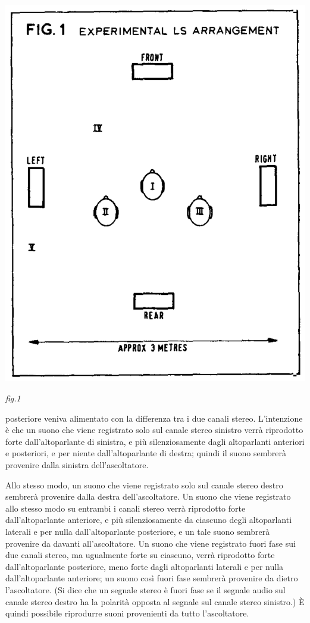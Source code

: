 \documentclass[11pt]{article}
\begin{document}
\begin{multicols*}{2}
\begin{center}
\includegraphics[scale=0.4]{images/fig_01.png}

{\scriptsize \emph{fig.1 }}
\end{center}

 posteriore veniva alimentato con la differenza tra i due canali stereo. L'intenzione è che un suono che viene registrato solo sul canale stereo sinistro verrà riprodotto forte dall'altoparlante di sinistra, e più silenziosamente dagli altoparlanti anteriori e posteriori, e per niente dall'altoparlante di destra; quindi il suono sembrerà provenire dalla sinistra dell'ascoltatore. 


Allo stesso modo, un suono che viene registrato solo sul canale stereo destro sembrerà provenire dalla destra dell'ascoltatore. Un suono che viene registrato allo stesso modo su entrambi i canali stereo verrà riprodotto forte dall'altoparlante anteriore, e più silenziosamente da ciascuno degli altoparlanti laterali e per nulla dall'altoparlante posteriore, e un tale suono sembrerà provenire da davanti all'ascoltatore. Un suono che viene registrato fuori fase sui due canali stereo, ma ugualmente forte su ciascuno, verrà riprodotto forte dall'altoparlante posteriore, meno forte dagli altoparlanti laterali e per nulla dall'altoparlante anteriore; un suono così fuori fase sembrerà provenire da dietro l'ascoltatore. (Si dice che un segnale stereo è fuori fase se il segnale audio sul canale stereo destro ha la polarità opposta al segnale sul canale stereo sinistro.) È quindi possibile riprodurre suoni provenienti da tutto l’ascoltatore. 


\end{multicols*}
\end{document}
